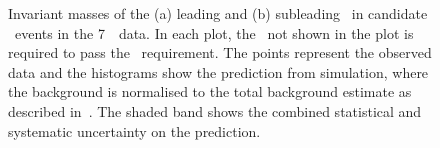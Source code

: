 \begin{figure}[htbp]
    \begin{center}
    \caption[Invariant masses of the (a) leading and (b) subleading \leppair\
    in candidate \ZZ\ events in the 7~\tev\ data.]
    {Invariant masses of the (a) leading and (b) subleading \leppair\ in
    candidate \ZZ\ events in the 7~\tev\ data. In each plot, the \leppair\
    not shown in the plot is required to pass the \sstooos\
    requirement. The points represent the observed data and the histograms show
    the prediction from simulation, where the background is normalised to the
    total background estimate as described in~.  The
    shaded band shows the combined statistical and systematic uncertainty on the
    prediction. 
}
    \label{fig:zzdists-Zmass-seven}
\end{center}
\end{figure}

